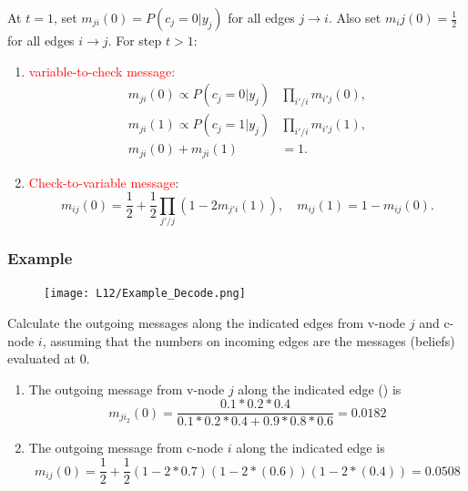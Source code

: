 \documentclass[12pt]{article}
\begin{document}
At $t=1$, set $m_{ji}(0)=P(c_j=0|y_j)$ for all edges $j\rightarrow i$. Also set $m_ij(0)=\frac{1}{2}$ for all edges $i\rightarrow j$. For step $t>1$:
\begin{enumerate}
    \item \textcolor{red}{variable-to-check message:}
    \begin{align*}
        m_{ji}(0) \propto P(c_j=0|y_j)&\prod_{i'/i}m_{i'j}(0),\\
        m_{ji}(1) \propto P(c_j=1|y_j)&\prod_{i'/i}m_{i'j}(1),\\
        m_{ji}(0) + m_{ji}(1) &= 1.
    \end{align*}
    \item \textcolor{red}{Check-to-variable message}:
    \[
    m_{ij}(0) = \frac{1}{2} + \frac{1}{2}\prod_{j'/j}(1-2m_{j'i}(1)), \quad m_{ij}(1) = 1 - m_{ij}(0).
    \]
\end{enumerate}
\subsubsection{Example}
\begin{figure}[H]
    \centering
    \texttt{[image: L12/Example\_Decode.png]}
\end{figure}
Calculate the outgoing messages along the indicated edges from v-node $j$ and c-node $i$, assuming that the numbers on incoming edges are the messages (beliefs) evaluated at 0.
\begin{enumerate}
    \item The outgoing message from v-node $j$ along the indicated edge () is 
    \[
    m_{ji_2}(0) = \frac{0.1*0.2*0.4}{0.1*0.2*0.4 + 0.9*0.8*0.6} = 0.0182
    \]
    \item The outgoing message from c-node $i$ along the indicated edge is 
    \[
    m_{ij}(0) = \frac{1}{2} + \frac{1}{2}(1-2*0.7)(1-2*(0.6))(1-2*(0.4)) = 0.0508
    \]
\end{enumerate}
\end{document}
